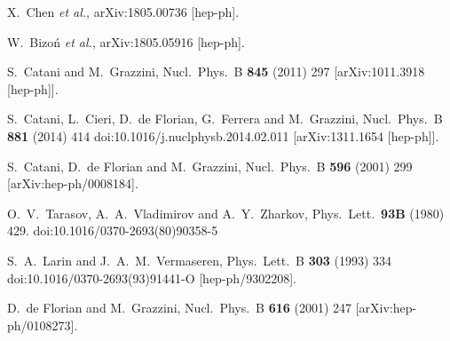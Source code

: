 \documentclass[12pt]{article}
\begin{document}
\begin{thebibliography}{99}
  X.~Chen {\it et al.},
  arXiv:1805.00736 [hep-ph].

  W.~Bizoń {\it et al.},
  arXiv:1805.05916 [hep-ph].
  
  S.~Catani and M.~Grazzini,
  Nucl.\ Phys.\ B {\bf 845} (2011) 297
[arXiv:1011.3918 [hep-ph]].

  S.~Catani, L.~Cieri, D.~de Florian, G.~Ferrera and M.~Grazzini,
  Nucl.\ Phys.\ B {\bf 881} (2014) 414
  doi:10.1016/j.nuclphysb.2014.02.011
  [arXiv:1311.1654 [hep-ph]].
  
  S.~Catani, D.~de Florian and M.~Grazzini,
  Nucl.\ Phys.\  B {\bf 596} (2001) 299
[arXiv:hep-ph/0008184].

  O.~V.~Tarasov, A.~A.~Vladimirov and A.~Y.~Zharkov,
  Phys.\ Lett.\  {\bf 93B} (1980) 429.
  doi:10.1016/0370-2693(80)90358-5
  
  S.~A.~Larin and J.~A.~M.~Vermaseren,
  Phys.\ Lett.\ B {\bf 303} (1993) 334
  doi:10.1016/0370-2693(93)91441-O
  [hep-ph/9302208].



  D.~de Florian and M.~Grazzini,
  Nucl.\ Phys.\  B {\bf 616} (2001) 247
[arXiv:hep-ph/0108273].
 

\end{thebibliography}
\end{document}
